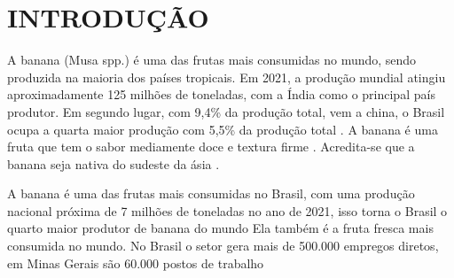 \chapter{INTRODUÇÃO}

 A banana (Musa spp.) é uma das frutas mais consumidas no mundo, sendo produzida na maioria dos países tropicais. Em 2021, a produção mundial atingiu aproximadamente 125 milhões de toneladas, com a Índia como o principal país produtor. Em segundo lugar, com 9,4\% da produção total, vem a china, o Brasil ocupa a quarta maior produção com 5,5\% da produção total \cite{banana}. A banana é uma fruta que tem o sabor mediamente doce e textura firme \cite{MATSUURA2004}. Acredita-se que a banana seja nativa do sudeste da ásia \cite{1956TaOo}.

A banana é uma das frutas mais consumidas no Brasil, com uma produção nacional próxima de 7 milhões de toneladas no ano de 2021, isso torna o Brasil o quarto maior produtor de banana do mundo \cite{banana} Ela também é a fruta fresca mais consumida no mundo. No Brasil o setor gera mais de 500.000 empregos diretos, em Minas Gerais são 60.000 postos de trabalho